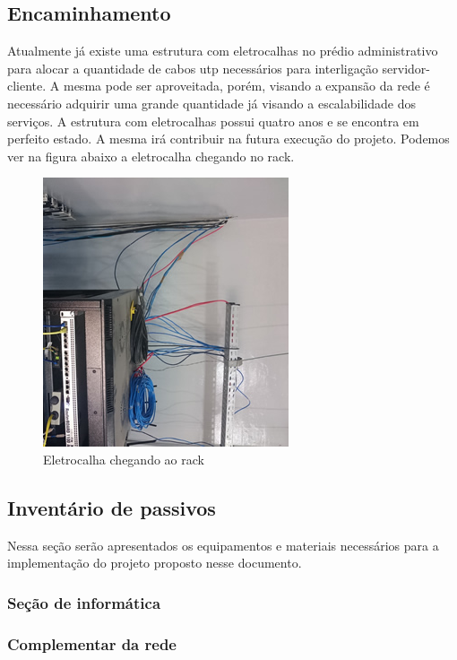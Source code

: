 \documentclass[12pt, a4paper]{article}
\begin{document}
	\subsection{Encaminhamento}
	Atualmente já existe uma estrutura com eletrocalhas no prédio administrativo para alocar a quantidade de cabos utp necessários para interligação servidor-cliente. A mesma pode ser aproveitada, porém, visando a expansão da rede é necessário adquirir uma grande quantidade já visando a escalabilidade dos serviços.
	A estrutura com eletrocalhas possui quatro anos e se encontra em perfeito estado. A mesma irá contribuir na futura execução do projeto. Podemos ver na figura abaixo a eletrocalha chegando no rack.
	\FloatBarrier
	\begin{figure}[!htp]
		\centering
		\includegraphics[scale=0.9]{eletr.jpg}
		\caption{Eletrocalha chegando ao rack}
	\end{figure}
	\FloatBarrier
	\subsection{Inventário de passivos}
	Nessa seção serão apresentados os equipamentos e materiais necessários para a implementação do projeto proposto nesse documento.
	\subsubsection{Seção de informática}
	\FloatBarrier
	
	\FloatBarrier
	\subsubsection{Complementar da rede}
	\FloatBarrier
	
	\FloatBarrier
\end{document}
